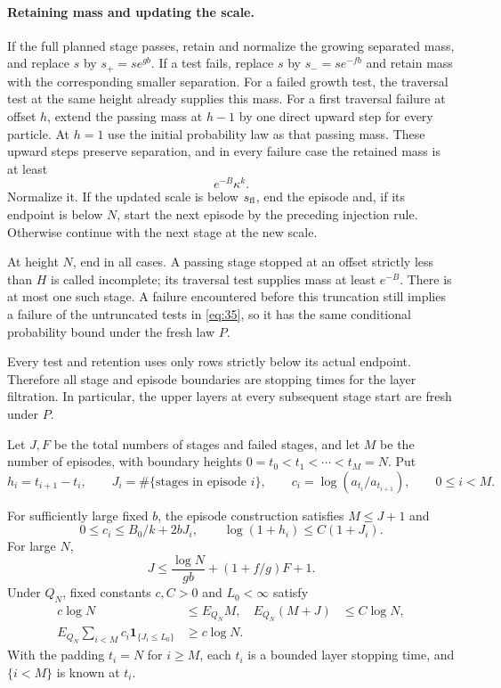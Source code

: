 \paragraph{Retaining mass and updating the scale.}
If the full planned stage passes, retain and normalize the growing
separated mass, and replace \(s\) by \(s_+=se^{gb}\).
If a test fails, replace \(s\) by \(s_-=se^{-fb}\) and retain mass
with the corresponding smaller separation. For a failed growth test,
the traversal test at the same height already supplies this mass. For
a first traversal failure at offset \(h\), extend the passing mass at
\(h-1\) by one direct upward step for every particle. At \(h=1\)
use the initial probability law as that passing mass. These upward
steps preserve separation, and in every failure case the retained mass
is at least
\[
 e^{-B}\kappa^k.
\]
Normalize it. If the updated scale is below \(s_{\rm fl}\), end the
episode and, if its endpoint is below \(N\), start the next episode
by the preceding injection rule. Otherwise continue with the next
stage at the new scale.

At height \(N\), end in all cases. A passing stage stopped at an
offset strictly less than \(H\) is called incomplete; its traversal
test supplies mass at least \(e^{-B}\). There is at most one such
stage. A failure encountered before this truncation still implies a
failure of the untruncated tests in \eqref{eq:35}, so it has the same
conditional probability bound under the fresh law \(P\).

Every test and retention uses only rows strictly below its actual
endpoint. Therefore all stage and episode boundaries are stopping times
for the layer filtration. In particular, the upper layers at every
subsequent stage start are fresh under \(P\).

Let \(J,F\) be the total numbers of stages and failed stages, and let
\(M\) be the number of episodes, with boundary heights
\(0=t_0<t_1<\cdots<t_M=N\). Put
\[
 h_i=t_{i+1}-t_i,\qquad
 J_i=\#\{\text{stages in episode }i\},\qquad
 c_i=\log(a_{t_i}/a_{t_{i+1}}),\qquad 0\le i<M.
\]

\begin{lemma}\label{stage-episodes}
For sufficiently large fixed \(b\), the episode construction satisfies
\(M\le J+1\) and
\[
 0\le c_i\le B_0/k+2bJ_i,\qquad
 \log(1+h_i)\le C(1+J_i).
 \tag{38}\label{eq:38}
\]
For large \(N\),
\[
 J\le\frac{\log N}{gb}+(1+f/g)F+1.
 \tag{39}\label{eq:39}
\]
Under \(Q_N\), fixed constants \(c,C>0\) and \(L_0<\infty\)
satisfy
\[
\begin{aligned}
 c\log N&\le E_{Q_N}M,& E_{Q_N}(M+J)&\le C\log N,\\
 E_{Q_N}\sum_{i<M}c_i\mathbf1_{\{J_i\le L_0\}}
   &\ge c\log N.&&
\end{aligned}
\tag{40}\label{eq:40}
\]
With the padding \(t_i=N\) for \(i\ge M\), each \(t_i\) is a
bounded layer stopping time, and \(\{i<M\}\) is known at \(t_i\).
\end{lemma}

